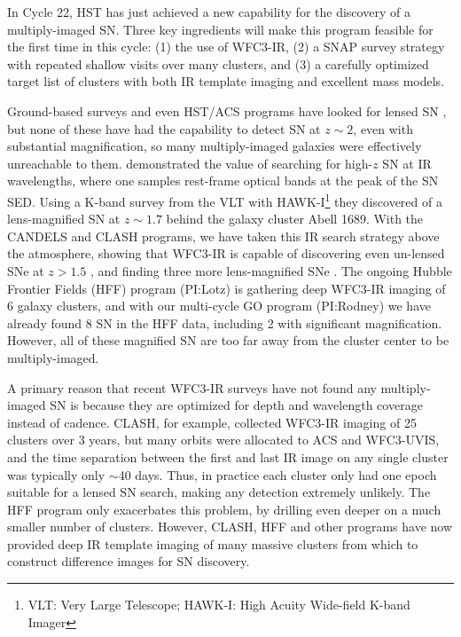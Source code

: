    

In Cycle 22, HST has just achieved a new capability for the discovery
of a multiply-imaged SN. Three key ingredients will make this program
feasible for the first time in this cycle: (1) the use of
WFC3-IR, (2) a SNAP survey strategy
with repeated shallow visits over many clusters, and (3) a carefully
optimized target list of clusters with both IR template imaging
and excellent mass models.

 Ground-based surveys and even HST/ACS programs
have looked for lensed
SN \citep[e.g.][]{Sharon:2007,Dawson:2009,Sharon:2010,Sand:2011}, but
none of these have had the capability to detect SN at $z\sim2$, even
with substantial magnification, so many multiply-imaged
galaxies were effectively unreachable to them.
\citet{Amanullah:2011}
demonstrated the value of searching for high-$z$ SN at IR wavelengths,
where one samples rest-frame optical bands at the peak of the SN
SED. Using a K-band survey from the VLT with HAWK-I\footnote{VLT: Very
Large Telescope; HAWK-I: High Acuity Wide-field K-band Imager} they
discovered of a lens-magnified SN at $z\sim1.7$ behind the galaxy
cluster Abell 1689.  With the CANDELS and CLASH programs, we have
taken this IR search strategy above the atmosphere, showing that
WFC3-IR is capable of discovering even un-lensed SNe at
$z>1.5$ \citep{Rodney:2012,Jones:2013}, and finding three more
lens-magnified SNe \citep{Patel:2013,Nordin:2014}.  The ongoing Hubble
Frontier Fields (HFF) program (PI:Lotz) is gathering deep WFC3-IR
imaging of 6 galaxy clusters, and with our multi-cycle GO program
(PI:Rodney) we have already found 8 SN in the HFF data, including 2
with significant magnification.  However, all of these magnified SN
are too far away from the cluster center to be multiply-imaged.

 A primary reason that
recent WFC3-IR surveys have not found any multiply-imaged SN is
because they are optimized for depth and wavelength coverage instead
of cadence.  CLASH, for example, collected WFC3-IR imaging of 25
clusters over 3 years, but many orbits were allocated to ACS and
WFC3-UVIS, and the time separation between the first and last IR image
on any single cluster was typically only $\sim$40 days.  Thus, in
practice each cluster only had one epoch suitable for a lensed SN
search, making any detection extremely unlikely.  The HFF program only
exacerbates this problem, by drilling even deeper on a much smaller
number of clusters.  However, CLASH, HFF and other programs have now
provided deep IR template imaging of many massive clusters from which
to construct difference images for SN discovery.

